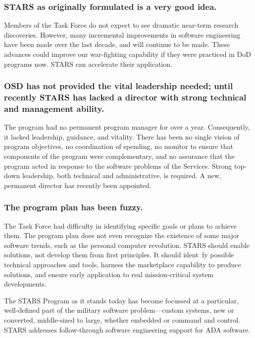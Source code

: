 \documentclass[12pt]{article}
\begin{document}
\subsubsection*{STARS as originally formulated is a very good idea.}

Members of the Task Force do not expect to see dramatic near-term research
discoveries. However, many incremental improvements in software engineering
have been made over the last decade, and will continue to be made. These
advances could improve our war-fighting capability if they were practiced in
DoD programs now. STARS can accelerate their application.

\subsubsection*{OSD has not provided the vital leadership needed; until recently
STARS has lacked a director with strong technical and management ability.}

The program had no permanent program manager for over a year. Consequently, it
lacked leadership, guidance, and vitality. There has been no single vision of
program objectives, no coordination of spending, no monitor to ensure that
components of the program were complementary, and no assurance that the program
acted in response to the software problems of the Services. Strong top-down
leadership, both technical and administrative, is required. A new, permanent
director has recently been appointed.

\subsubsection*{The program plan has been fuzzy.}

The Task Force had difficulty in identifying specific goals or plans to achieve
them. The program plan does not even recognize the existence of some major
software trends, such as the personal computer revolution. STARS should enable
solutions, not develop them from first principles. It should ident~fy possible
technical approaches and tools, harness the marketplace capability to produce
solutions, and ensure early application to real mission-critical system
developments.

The STARS Program as it stands today has become focussed at a particular,
well-defined part of the military software problem—custom systems, new or
converted, middle-sized to large, whether embedded or command and control.
STARS addresses follow-through software engineering support for ADA software.
\end{document}
